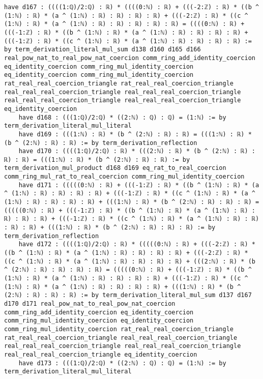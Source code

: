 \documentclass{article}
\begin{document}
\begin{tcolorbox}[colback=white!10, width=\linewidth]
\begin{lstlisting}[language=Lean4]
    have d167 : ((((1:ℚ)/2:ℚ) : ℝ) * ((((0:ℕ) : ℝ) + (((-2:ℤ) : ℝ) * ((b ^ (1:ℕ) : ℝ) * (a ^ (1:ℕ) : ℝ) : ℝ) : ℝ) : ℝ) + (((-2:ℤ) : ℝ) * ((c ^ (1:ℕ) : ℝ) * (a ^ (1:ℕ) : ℝ) : ℝ) : ℝ) : ℝ) : ℝ) = ((((0:ℕ) : ℝ) + (((-1:ℤ) : ℝ) * ((b ^ (1:ℕ) : ℝ) * (a ^ (1:ℕ) : ℝ) : ℝ) : ℝ) : ℝ) + (((-1:ℤ) : ℝ) * ((c ^ (1:ℕ) : ℝ) * (a ^ (1:ℕ) : ℝ) : ℝ) : ℝ) : ℝ) := by term_derivation_literal_mul_sum d138 d160 d165 d166 real_pow_nat_to_real_pow_nat_coercion comm_ring_add_identity_coercion eq_identity_coercion comm_ring_mul_identity_coercion eq_identity_coercion comm_ring_mul_identity_coercion rat_real_real_coercion_triangle rat_real_real_coercion_triangle real_real_real_coercion_triangle real_real_real_coercion_triangle real_real_real_coercion_triangle real_real_real_coercion_triangle eq_identity_coercion
    have d168 : (((1:ℚ)/2:ℚ) * ((2:ℕ) : ℚ) : ℚ) = (1:ℕ) := by term_derivation_literal_mul_literal
    have d169 : (((1:ℕ) : ℝ) * (b ^ (2:ℕ) : ℝ) : ℝ) = (((1:ℕ) : ℝ) * (b ^ (2:ℕ) : ℝ) : ℝ) := by term_derivation_reflection
    have d170 : ((((1:ℚ)/2:ℚ) : ℝ) * (((2:ℕ) : ℝ) * (b ^ (2:ℕ) : ℝ) : ℝ) : ℝ) = (((1:ℕ) : ℝ) * (b ^ (2:ℕ) : ℝ) : ℝ) := by term_derivation_mul_product d168 d169 eq_rat_to_real_coercion comm_ring_mul_rat_to_real_coercion comm_ring_mul_identity_coercion
    have d171 : (((((0:ℕ) : ℝ) + (((-1:ℤ) : ℝ) * ((b ^ (1:ℕ) : ℝ) * (a ^ (1:ℕ) : ℝ) : ℝ) : ℝ) : ℝ) + (((-1:ℤ) : ℝ) * ((c ^ (1:ℕ) : ℝ) * (a ^ (1:ℕ) : ℝ) : ℝ) : ℝ) : ℝ) + (((1:ℕ) : ℝ) * (b ^ (2:ℕ) : ℝ) : ℝ) : ℝ) = (((((0:ℕ) : ℝ) + (((-1:ℤ) : ℝ) * ((b ^ (1:ℕ) : ℝ) * (a ^ (1:ℕ) : ℝ) : ℝ) : ℝ) : ℝ) + (((-1:ℤ) : ℝ) * ((c ^ (1:ℕ) : ℝ) * (a ^ (1:ℕ) : ℝ) : ℝ) : ℝ) : ℝ) + (((1:ℕ) : ℝ) * (b ^ (2:ℕ) : ℝ) : ℝ) : ℝ) := by term_derivation_reflection
    have d172 : ((((1:ℚ)/2:ℚ) : ℝ) * (((((0:ℕ) : ℝ) + (((-2:ℤ) : ℝ) * ((b ^ (1:ℕ) : ℝ) * (a ^ (1:ℕ) : ℝ) : ℝ) : ℝ) : ℝ) + (((-2:ℤ) : ℝ) * ((c ^ (1:ℕ) : ℝ) * (a ^ (1:ℕ) : ℝ) : ℝ) : ℝ) : ℝ) + (((2:ℕ) : ℝ) * (b ^ (2:ℕ) : ℝ) : ℝ) : ℝ) : ℝ) = (((((0:ℕ) : ℝ) + (((-1:ℤ) : ℝ) * ((b ^ (1:ℕ) : ℝ) * (a ^ (1:ℕ) : ℝ) : ℝ) : ℝ) : ℝ) + (((-1:ℤ) : ℝ) * ((c ^ (1:ℕ) : ℝ) * (a ^ (1:ℕ) : ℝ) : ℝ) : ℝ) : ℝ) + (((1:ℕ) : ℝ) * (b ^ (2:ℕ) : ℝ) : ℝ) : ℝ) := by term_derivation_literal_mul_sum d137 d167 d170 d171 real_pow_nat_to_real_pow_nat_coercion comm_ring_add_identity_coercion eq_identity_coercion comm_ring_mul_identity_coercion eq_identity_coercion comm_ring_mul_identity_coercion rat_real_real_coercion_triangle rat_real_real_coercion_triangle real_real_real_coercion_triangle real_real_real_coercion_triangle real_real_real_coercion_triangle real_real_real_coercion_triangle eq_identity_coercion
    have d173 : (((1:ℚ)/2:ℚ) * ((2:ℕ) : ℚ) : ℚ) = (1:ℕ) := by term_derivation_literal_mul_literal

\end{lstlisting}
\end{tcolorbox}
\end{document}
